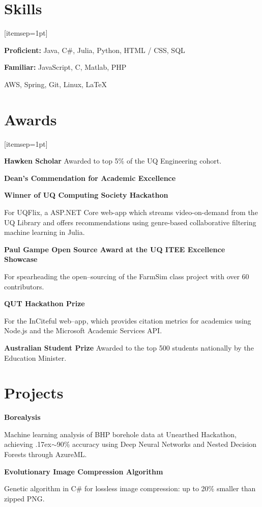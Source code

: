 \documentclass[a4paper]{article}
\renewenvironment{itemize}{
  \begin{list}{}{
    \setlength{\leftmargin}{1.5em}
  }
}{
  \end{list}
}
\newcommand{\dateitem}[1] {\item[\textbf{#1 :}]}
\renewcommand{\tilde} {{\raise.17ex\hbox{$\scriptstyle\mathtt{\sim}$}}}
\newcommand{\accentcolour}{\color{NavyBlue}}
\newcommand{\resumesection}[1]{\section*{\accentcolour #1}}
\begin{document}
\resumesection{Skills}
\begin{itemize}[itemsep=1pt]
	\dateitem{Languages} {
		\textbf{Proficient:} Java, C\#, Julia, Python, HTML / CSS, SQL
		
		\textbf{Familiar:} JavaScript, C, Matlab, PHP
	}
	\dateitem{Technologies} {
		AWS, Spring, Git, Linux, \LaTeX
	}
\end{itemize}

\resumesection{Awards}
\begin{itemize}[itemsep=1pt]
	\dateitem{2017 -- 2019} {\textbf{Hawken Scholar} Awarded to top 5\% of the UQ Engineering cohort.
	}
	\dateitem{2016 -- 2017} \textbf{Dean's Commendation for Academic Excellence}
	\dateitem{2016} {\textbf{Winner of UQ Computing Society Hackathon}
		
		For UQFlix, a ASP.NET Core web-app which streams video-on-demand from the UQ Library and offers recommendations using genre-based collaborative filtering machine learning in Julia.
	}
	\dateitem{2015} {\textbf{Paul Gampe Open Source Award at the UQ ITEE Excellence Showcase}
		
		For spearheading the open--sourcing of the FarmSim class project with over 60 contributors.
	}

	\dateitem{2015} {\textbf{QUT Hackathon Prize}
		
		For the InCiteful web--app, which provides citation metrics for academics using Node.js and the Microsoft Academic Services API.
	}
	\dateitem{2013} {\textbf{Australian Student Prize} Awarded to the top 500 students nationally by the Education Minister.
	}
\end{itemize}

\resumesection{Projects}
\begin{itemize}	
	\dateitem{2016} {\textbf{Borealysis}
		
		Machine learning analysis of BHP borehole data at Unearthed Hackathon, achieving \tilde{}90\% accuracy using Deep Neural Networks and Nested Decision Forests through AzureML.
	}
	
	\dateitem{2013} {\textbf{Evolutionary Image Compression Algorithm}
		
		Genetic algorithm in C\# for lossless image compression: up to 20\% smaller than zipped PNG.
	}
\end{itemize}

\bigskip
\end{document}
